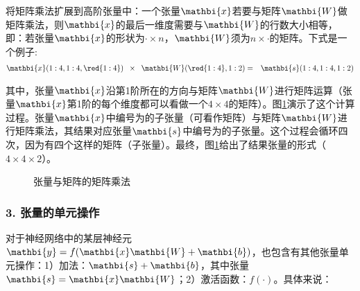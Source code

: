 \parinterval 将矩阵乘法扩展到高阶张量中：一个张量${\mathbi{x}}$若要与矩阵$ {\mathbi{W}}$做矩阵乘法，则$ {\mathbi{x}} $的最后一维度需要与${\mathbi{W}}$的行数大小相等，即：若张量${\mathbi{x}} $的形状为$ \cdot \times n $，${\mathbi{W}} $须为$ n\times \cdot $的矩阵。下式是一个例子:
\begin{eqnarray}
{\mathbi{x}}(1:4,1:4,{\red{1:4}})\;\;\times\;\; {{\mathbi{W}}({\red{1:4}},1:2)}&=&{\mathbi{s}}(1:4,1:4,1:2)
\label{eq:9-25}
\end{eqnarray}

\noindent 其中，张量${\mathbi{x}} $沿第1阶所在的方向与矩阵$ {\mathbi{W}}$进行矩阵运算（张量${\mathbi{x}}$第1阶的每个维度都可以看做一个$ 4\times 4 $的矩阵）。图\ref{fig:9-27}演示了这个计算过程。张量${\mathbi{x}}$中编号为的子张量（可看作矩阵）与矩阵${\mathbi{W}}$进行矩阵乘法，其结果对应张量$ {\mathbi{s}}$中编号为的子张量。这个过程会循环四次，因为有四个这样的矩阵（子张量）。最终，图\ref{fig:9-27}给出了结果张量的形式（$ 4 \times 4 \times 2 $）。

\begin{figure}[htp]
\centering

\caption{张量与矩阵的矩阵乘法}
\label{fig:9-27}
\end {figure}

\subsubsection{3. 张量的单元操作}
\vspace{0.5em}

\parinterval 对于神经网络中的某层神经元$ {\mathbi{y}}=f({\mathbi{x}} {\mathbi{W}}+{\mathbi{b}}) $，也包含有其他张量单元操作：1）加法：$ {\mathbi{s}}+{\mathbi{b}}$，其中张量$ {\mathbi{s}}={\mathbi{x}}{\mathbi{W}} $；2）激活函数：$ f(\cdot) $。具体来说：


